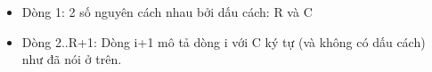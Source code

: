 \begin{itemize}
	\item     Dòng 1: 2 số nguyên cách nhau bởi dấu cách: R và C   
	\item     Dòng 2..R+1: Dòng i+1 mô tả dòng i với C ký tự (và không có dấu          cách) như đã nói ở trên.   
\end{itemize}